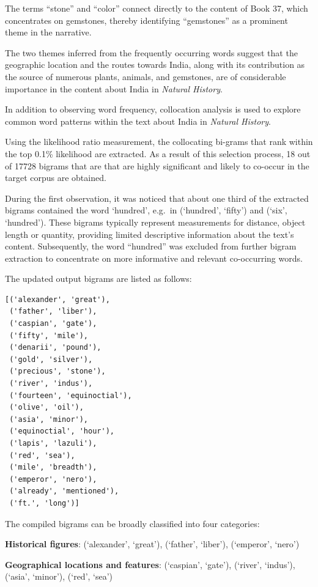 \documentclass[
  12pt,
]{article}
\begin{document}
The terms ``stone'' and ``color'' connect directly to the content of
Book 37, which concentrates on gemstones, thereby identifying
``gemstones'' as a prominent theme in the narrative.

The two themes inferred from the frequently occurring words suggest that
the geographic location and the routes towards India, along with its
contribution as the source of numerous plants, animals, and gemstones,
are of considerable importance in the content about India in
\emph{Natural History}.

In addition to observing word frequency, collocation analysis is used to
explore common word patterns within the text about India in
\emph{Natural History}.

Using the likelihood ratio measurement, the collocating bi-grams that
rank within the top 0.1\% likelihood are extracted. As a result of this
selection process, 18 out of 17728 bigrams that are that are highly
significant and likely to co-occur in the target corpus are obtained.

During the first observation, it was noticed that about one third of the
extracted bigrams contained the word `hundred', e.g.~in (`hundred',
`fifty') and (`six', `hundred'). These bigrams typically represent
measurements for distance, object length or quantity, providing limited
descriptive information about the text's content. Subsequently, the word
``hundred'' was excluded from further bigram extraction to concentrate
on more informative and relevant co-occurring words.

The updated output bigrams are listed as follows:

\begin{verbatim}
[('alexander', 'great'),
 ('father', 'liber'),
 ('caspian', 'gate'),
 ('fifty', 'mile'),
 ('denarii', 'pound'),
 ('gold', 'silver'),
 ('precious', 'stone'),
 ('river', 'indus'),
 ('fourteen', 'equinoctial'),
 ('olive', 'oil'),
 ('asia', 'minor'),
 ('equinoctial', 'hour'),
 ('lapis', 'lazuli'),
 ('red', 'sea'),
 ('mile', 'breadth'),
 ('emperor', 'nero'),
 ('already', 'mentioned'),
 ('ft.', 'long')]
\end{verbatim}

The compiled bigrams can be broadly classified into four categories:

\textbf{Historical figures}: (`alexander', `great'), (`father',
`liber'), (`emperor', `nero')

\textbf{Geographical locations and features}: (`caspian', `gate'),
(`river', `indus'), (`asia', `minor'), (`red', `sea')
\end{document}
